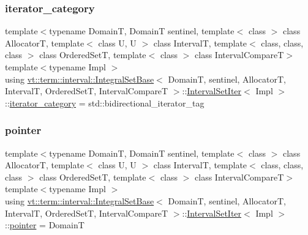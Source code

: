 \subsubsection{\texorpdfstring{iterator\+\_\+category}{iterator\_category}}
{\footnotesize\ttfamily template$<$typename DomainT, DomainT sentinel, template$<$ class $>$ class AllocatorT, template$<$ class U, U $>$ class IntervalT, template$<$ class, class, class $>$ class Ordered\+SetT, template$<$ class $>$ class Interval\+CompareT$>$ \\
template$<$typename Impl $>$ \\
using \hyperlink{structvt_1_1term_1_1interval_1_1_integral_set_base}{vt\+::term\+::interval\+::\+Integral\+Set\+Base}$<$ DomainT, sentinel, AllocatorT, IntervalT, Ordered\+SetT, Interval\+CompareT $>$\+::\hyperlink{structvt_1_1term_1_1interval_1_1_integral_set_base_1_1_interval_set_iter}{Interval\+Set\+Iter}$<$ Impl $>$\+::\hyperlink{structvt_1_1term_1_1interval_1_1_integral_set_base_1_1_interval_set_iter_a50527fe18f4660916ae341f4d06b40d4}{iterator\+\_\+category} =  std\+::bidirectional\+\_\+iterator\+\_\+tag}

\mbox{\label{structvt_1_1term_1_1interval_1_1_integral_set_base_1_1_interval_set_iter_a9da8b4820369a4e830f6ca596e08270c}} 
\subsubsection{\texorpdfstring{pointer}{pointer}}
{\footnotesize\ttfamily template$<$typename DomainT, DomainT sentinel, template$<$ class $>$ class AllocatorT, template$<$ class U, U $>$ class IntervalT, template$<$ class, class, class $>$ class Ordered\+SetT, template$<$ class $>$ class Interval\+CompareT$>$ \\
template$<$typename Impl $>$ \\
using \hyperlink{structvt_1_1term_1_1interval_1_1_integral_set_base}{vt\+::term\+::interval\+::\+Integral\+Set\+Base}$<$ DomainT, sentinel, AllocatorT, IntervalT, Ordered\+SetT, Interval\+CompareT $>$\+::\hyperlink{structvt_1_1term_1_1interval_1_1_integral_set_base_1_1_interval_set_iter}{Interval\+Set\+Iter}$<$ Impl $>$\+::\hyperlink{structvt_1_1term_1_1interval_1_1_integral_set_base_1_1_interval_set_iter_a9da8b4820369a4e830f6ca596e08270c}{pointer} =  DomainT}

